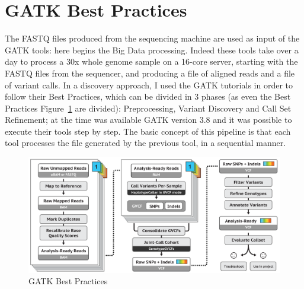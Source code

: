 \section{GATK Best Practices}
The FASTQ files produced from the sequencing machine are used as input of the GATK tools: here begins the Big Data processing. Indeed these tools take over a day to process a 30x whole genome sample on a 16-core server, starting with the FASTQ files from the sequencer, and producing a file of aligned reads and a file of variant calls.\newline
In a discovery approach, I used the GATK tutorials in order to follow their Best Practices, which can be divided in 3 phases (as even the Best Practices Figure~\ref{best_practices} are divided): Preprocessing, Variant Discovery and Call Set Refinement; at the time was available GATK version 3.8 and it was possible to execute their tools step by step. The basic concept of this pipeline is that each tool processes the file generated by the previous tool, in a sequential manner.
\begin{figure}[h] 
\begin{center}
\includegraphics[scale=0.31]{figure/best_practices.png}
\end{center}
\caption{GATK Best Practices ~\label{best_practices}}
\end{figure}
